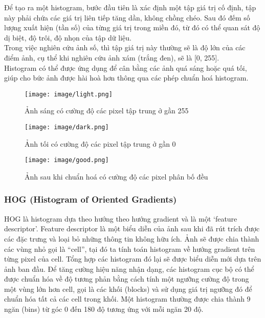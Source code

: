 \documentclass[12pt,a4paper]{article}
\begin{document}
Để tạo ra một histogram, bước đầu tiên là xác định một tập giá trị cố định, tập này phải chứa các giá trị liên tiếp tăng dần, không chồng chéo. Sau đó đếm số lượng xuất hiện (tần số) của từng giá trị trong miền đó, từ đó có thể quan sát độ dị biệt, độ trôi, độ nhọn của tập dữ liệu.\\

Trong việc nghiên cứu ảnh số, thì tập giá trị này thường sẽ là độ lớn của các điểm ảnh, cụ thể khi nghiên cứu ảnh xám (trắng đen), sẽ là [0, 255]. \\
Histogram có thể được ứng dụng để cân bằng các ảnh quá sáng hoặc quá tối, giúp cho bức ảnh được hài hoà hơn thông qua các phép chuẩn hoá histogram.
 \begin{figure}[H]
        \centering
        \texttt{[image: image/light.png]}
        \caption{Ảnh sáng có cường độ các pixel tập trung ở gần 255 \cite{HistPicture}}
        \label{fig:my_label}
    \end{figure}

    \begin{figure}[H]
        \centering
        \texttt{[image: image/dark.png]}
        \caption{Ảnh tối có cường độ các pixel tập trung ở gần 0 \cite{HistPicture}}
        \label{fig:my_label}
    \end{figure}
    \begin{figure}[H]
        \centering
        \texttt{[image: image/good.png]}
        \caption{Ảnh sau khi chuẩn hoá có cường độ các pixel phân bố đều \cite{HistPicture}}
        \label{fig:my_label}
    \end{figure}
\subsubsection*{HOG (Histogram of Oriented Gradients)}
HOG là histogram dựa theo hướng theo hướng gradient và là một ‘feature descriptor’. Feature descriptor là một biểu diễn của ảnh sau khi đã rút trích được các đặc trưng và loại bỏ những thông tin không hữu ích.  Ảnh sẽ được chia thành các vùng nhỏ gọi là “cell”, tại đó ta tính toán histogram về hướng gradient trên từng pixel của cell. Tổng hợp các histogram đó lại sẽ được biểu diễn mới dựa trên ảnh ban đầu. Để tăng cường hiệu năng nhận dạng, các histogram cục bộ có thể được chuẩn hóa về độ tương phản bằng cách tính một ngưỡng cường độ trong một vùng lớn hơn cell, gọi là các khối (blocks) và sử dụng giá trị ngưỡng đó để chuẩn hóa tất cả các cell trong khối. Một histogram thường được chia thành 9 ngăn (bins) từ góc 0 đến 180 độ tương ứng với mỗi ngăn 20 độ.
\end{document}
